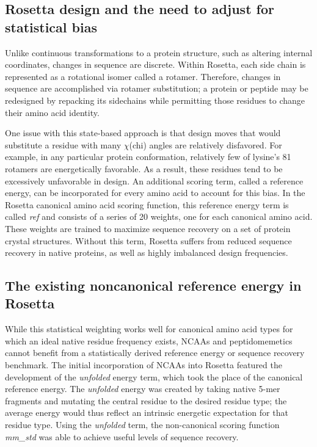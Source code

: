 \subsection{Rosetta design and the need to adjust for statistical bias}
Unlike continuous transformations to a protein structure, such as altering internal coordinates, changes in sequence are discrete.
Within Rosetta, each side chain is represented as a rotational isomer called a rotamer.
Therefore, changes in sequence are accomplished via rotamer substitution; a protein or peptide may be redesigned by repacking its sidechains while permitting those residues to change their amino acid identity\cite{leaver-fay_chapter_2011}.

One issue with this state-based approach is that design moves that would substitute a residue with many $\chi$(chi) angles are relatively disfavored. For example, in any particular protein conformation, relatively few of lysine's 81 rotamers are energetically favorable.
As a result, these residues tend to be excessively unfavorable in design\cite{leaver-fay_chapter_2013,rohl_protein_2004}.
An additional scoring term, called a reference energy, can be incorporated for every amino acid to account for this bias.
In the Rosetta canonical amino acid scoring function, this reference energy term is called \textit{ref} and consists of a series of 20 weights, one for each canonical amino acid.
These weights are trained to maximize sequence recovery on a set of protein crystal structures.
Without this term, Rosetta suffers from reduced sequence recovery in native proteins, as well as highly imbalanced design frequencies\cite{rohl_protein_2004}.

\subsection{The existing noncanonical reference energy in Rosetta}

While this statistical weighting works well for canonical amino acid types for which an ideal native residue frequency exists, NCAAs and peptidomemetics cannot benefit from a statistically derived reference energy or sequence recovery benchmark.
The initial incorporation of NCAAs into Rosetta featured the development of the \textit{unfolded} energy term, which took the place of the canonical reference energy\cite{renfrew_incorporation_2012}.
The \textit{unfolded} energy was created by taking native 5-mer fragments and mutating the central residue to the desired residue type; the average energy would thus reflect an intrinsic energetic expectation for that residue type.
Using the \textit{unfolded} term, the non-canonical scoring function \textit{mm\_std} was able to achieve useful levels of sequence recovery.

